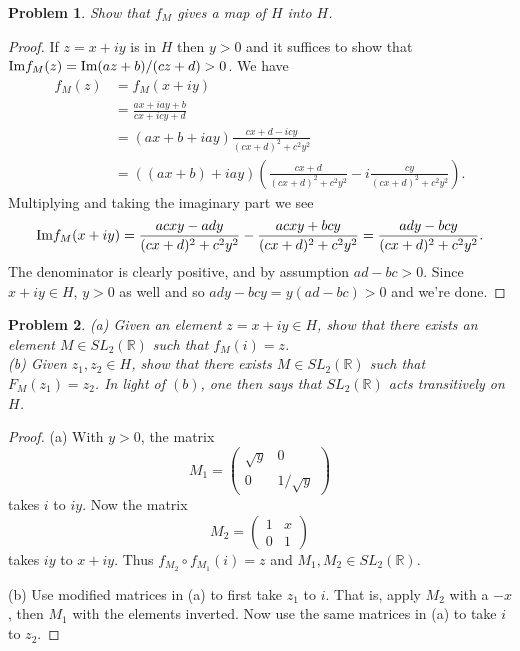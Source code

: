 \documentclass{article}
\newtheorem{problem}{Problem}
\begin{document}
\begin{problem}
Show that $f_M$ gives a map of $H$ into $H$.
\end{problem}
\begin{proof}
If $z = x + iy$ is in $H$ then $y > 0$ and it suffices to show that $\textup{Im} f_M(z) = \textup{Im} (az+b)/(cz+d) > 0$. We have
\begin{align*}
f_M(z)
&= f_M(x+iy)\\
&= \frac{ax+iay+b}{cx+icy+d}\\
&= (ax+b+iay)\frac{cx+d-icy}{(cx+d)^2+c^2y^2}\\
&= ((ax+b)+iay)\left ( \frac{cx+d}{(cx+d)^2+c^2y^2} - i \frac{cy}{(cx+d)^2+c^2y^2} \right ).
\end{align*}
Multiplying and taking the imaginary part we see
\[
\textup{Im}f_M(x+iy) = \frac{acxy-ady}{(cx+d)^2+c^2y^2} - \frac{acxy+bcy}{(cx+d)^2+c^2y^2} = \frac{ady-bcy}{(cx+d)^2+c^2y^2}.
\]
The denominator is clearly positive, and by assumption $ad-bc>0$. Since $x+iy \in H$, $y > 0$ as well and so $ady-bcy=y(ad-bc)> 0$ and we're done.
\end{proof}

\begin{problem}
\label{trans}
(a) Given an element $z=x+iy \in H$, show that there exists an element $M \in SL_2(\mathbb{R})$ such that $f_M(i) = z$.\\
(b) Given $z_1, z_2 \in H$, show that there exists $M \in SL_2(\mathbb{R})$ such that $F_M(z_1) = z_2$. In light of $(b)$, one then says that $SL_2(\mathbb{R})$ \emph{acts transitively} on $H$.
\end{problem}
\begin{proof}
(a) With $y > 0$, the matrix
\[
M_1 =
\left (
\begin{array}{cc}
\sqrt{y} & 0\\
0 & 1/\sqrt{y}
\end{array}
\right )
\]
takes $i$ to $iy$. Now the matrix
\[
M_2 =
\left (
\begin{array}{cc}
1 & x\\
0 & 1
\end{array}
\right )
\]
takes $iy$ to $x+iy$. Thus $f_{M_2} \circ f_{M_1} (i) = z$ and $M_1, M_2 \in SL_2(\mathbb{R})$.

(b) Use modified matrices in (a) to first take $z_1$ to $i$. That is, apply $M_2$ with a $-x$, then $M_1$ with the elements inverted. Now use the same matrices in (a) to take $i$ to $z_2$.
\end{proof}
\end{document}
